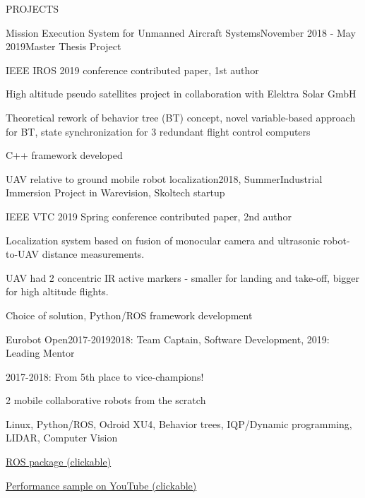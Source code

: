\documentclass{resume} %
\begin{document}
\begin{rSection}{PROJECTS}


\begin{rSubsection}{Mission Execution System for Unmanned Aircraft Systems}{November 2018 - May 2019}{Master Thesis Project}{} 
\item IEEE IROS 2019 conference contributed paper, 1st author
\item High altitude pseudo satellites project in collaboration with Elektra Solar GmbH 
\item Theoretical rework of behavior tree (BT) concept, novel variable-based approach for BT, state synchronization for 3 redundant flight control computers
\item C++ framework developed

\end{rSubsection} 



\begin{rSubsection}{UAV relative to ground mobile robot localization}{2018, Summer}{Industrial Immersion Project in Warevision, Skoltech startup}{}
\item IEEE VTC 2019 Spring conference contributed paper, 2nd author
\item Localization system based on fusion of monocular camera and ultrasonic robot-to-UAV distance measurements.
\item UAV had 2 concentric IR active markers - smaller for landing and take-off, bigger for high altitude flights.
\item Choice of solution, Python/ROS framework development
\end{rSubsection}



\begin{rSubsection}{Eurobot Open}{2017-2019}{2018: Team Captain, Software Development, 2019: Leading Mentor}{}
\item 2017-2018: From 5th place to vice-champions!
\item 2 mobile collaborative robots from the scratch
\item Linux, Python/ROS, Odroid XU4, Behavior trees, IQP/Dynamic programming, LIDAR, Computer Vision
\item \href{https://github.com/SkoltechRobotics/ros-eurobot-2018}{ROS package (clickable)} 
\item \href{https://youtu.be/9kTYelf_5CA?t=4115}{Performance sample on YouTube (clickable)}
\end{rSubsection}


\end{rSection}
\end{document}
